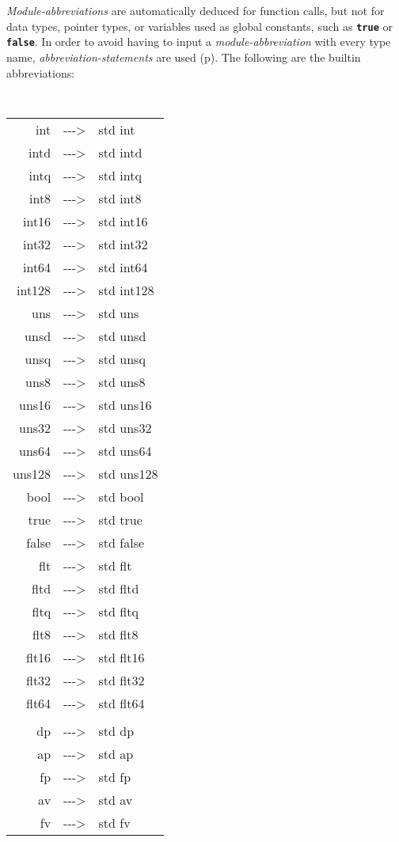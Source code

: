 \documentclass[12pt]{article}
\newcommand{\TT}[1]{{\tt \bfseries #1}}
\newcommand{\ABV}{-{}-{}->}
\newcommand{\pagref}[1]{p\pageref{#1}}
\begin{document}
{\em Module-abbreviations} are automatically deduced for function
calls, but not for data types, pointer types, or variables used
as global constants, such as \TT{true} or \TT{false}.
In order to avoid having to
input a {\em module-abbreviation} with every type name, 
{\em abbreviation-statements} are used (\pagref{ABBREVIATION-STATEMENT}).
The following are the builtin abbreviations:
\begin{center}
\tt
\begin{tabular}{rcl}
int		& \ABV & std int \\
intd		& \ABV & std intd \\
intq		& \ABV & std intq \\
int8		& \ABV & std int8 \\
int16		& \ABV & std int16 \\
int32		& \ABV & std int32 \\
int64		& \ABV & std int64 \\
int128		& \ABV & std int128
\\[1ex]
uns		& \ABV & std uns \\
unsd		& \ABV & std unsd \\
unsq		& \ABV & std unsq \\
uns8		& \ABV & std uns8 \\
uns16		& \ABV & std uns16 \\
uns32		& \ABV & std uns32 \\
uns64		& \ABV & std uns64 \\
uns128		& \ABV & std uns128
\\[1ex]
bool		& \ABV & std bool \\
true		& \ABV & std true \\
false		& \ABV & std false
\\[1ex]
flt		& \ABV & std flt \\
fltd		& \ABV & std fltd \\
fltq		& \ABV & std fltq \\
flt8		& \ABV & std flt8 \\
flt16		& \ABV & std flt16 \\
flt32		& \ABV & std flt32 \\
flt64		& \ABV & std flt64 \\
\\[1ex]
dp		& \ABV & std dp \\
ap		& \ABV & std ap \\
fp		& \ABV & std fp \\
av		& \ABV & std av \\
fv		& \ABV & std fv \\
\end{tabular}
\end{center}
\end{document}
